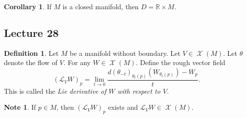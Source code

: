 \documentclass[10pt,letterpaper,cm]{nupset}
\theoremstyle{definition}
\newtheorem*{definition}{Definition}
\newtheorem{corollary}{Corollary}
\newtheorem*{note}{Note}
\newcommand{\R}{\mathbb R}
\newcommand{\1}{\mathbf{1}}
\newcommand{\0}{\vec 0}
\DeclareMathOperator{\vf}{\mathscr{X}}
\begin{document}
\begin{corollary}
If $M$ is a closed manifold, then $D = \R \times M$.
\end{corollary}

\subsection{Lecture 28}

\begin{definition}
Let $M$ be a manifold without boundary. Let $V\in \vf(M)$. Let $\theta$ denote the flow of $V$. For any $W\in \vf(M)$. Define the rough vector field $$ (\mathcal{L}_VW)_p  = \lim_{t\to 0}\frac{d(\theta_{-t})_{\theta_t(p)}(W_{\theta_{t}(p)})-W_p }{t}.$$ This is called the \textit{Lie derivative of $W$ with respect to $V$.}
\end{definition}
\begin{note}
If $p\in M$, then $(\mathcal{L}_VW)_p$ exists and $\mathcal{L}_VW \in \vf(M)$. 
\end{note}
\end{document}
